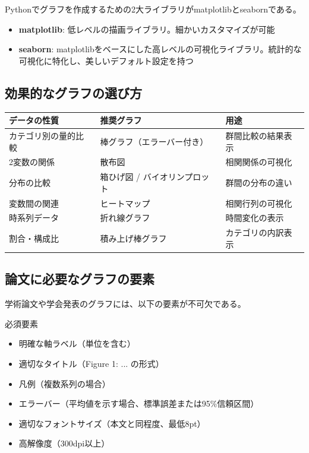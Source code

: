 Pythonでグラフを作成するための2大ライブラリがmatplotlibとseabornである。

\begin{itemize}
\item \textbf{matplotlib}: 低レベルの描画ライブラリ。細かいカスタマイズが可能
\item \textbf{seaborn}: matplotlibをベースにした高レベルの可視化ライブラリ。統計的な可視化に特化し、美しいデフォルト設定を持つ
\end{itemize}

\subsection{効果的なグラフの選び方}

\begin{table}[H]
\centering
\small
\begin{tabular}{lll}
\toprule
データの性質 & 推奨グラフ & 用途 \\
\midrule
カテゴリ別の量的比較 & 棒グラフ（エラーバー付き） & 群間比較の結果表示 \\
2変数の関係 & 散布図 & 相関関係の可視化 \\
分布の比較 & 箱ひげ図 / バイオリンプロット & 群間の分布の違い \\
変数間の関連 & ヒートマップ & 相関行列の可視化 \\
時系列データ & 折れ線グラフ & 時間変化の表示 \\
割合・構成比 & 積み上げ棒グラフ & カテゴリの内訳表示 \\
\bottomrule
\end{tabular}
\end{table}

\subsection{論文に必要なグラフの要素}

学術論文や学会発表のグラフには、以下の要素が不可欠である。

\begin{itembox}[l]{必須要素}
\begin{itemize}
\item 明確な軸ラベル（単位を含む）
\item 適切なタイトル（Figure 1: ... の形式）
\item 凡例（複数系列の場合）
\item エラーバー（平均値を示す場合、標準誤差または95\%信頼区間）
\item 適切なフォントサイズ（本文と同程度、最低8pt）
\item 高解像度（300dpi以上）
\end{itemize}
\end{itembox}

